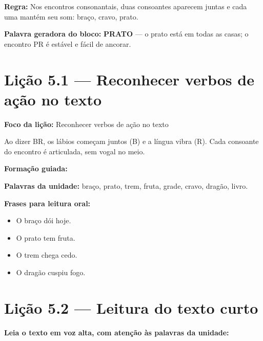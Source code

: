 \textbf{Regra:} Nos encontros consonantais, duas consoantes aparecem juntas e cada uma mantém seu som: braço, cravo, prato.

\textbf{Palavra geradora do bloco:} \textbf{PRATO} --- o prato está em todas as casas; o encontro PR é estável e fácil de ancorar.

\section{Lição 5.1 --- Reconhecer verbos de ação no texto}

\textbf{Foco da lição:} Reconhecer verbos de ação no texto


\begin{boquinha}
Ao dizer BR, os lábios começam juntos (B) e a língua vibra (R). Cada consoante do encontro é articulada, sem vogal no meio.
\end{boquinha}

\noindent\textbf{Formação guiada:}

\begin{center}
\end{center}

\noindent\textbf{Palavras da unidade:} braço, prato, trem, fruta, grade, cravo, dragão, livro.

\noindent\textbf{Frases para leitura oral:}
\begin{itemize}[leftmargin=1.6em]
  \item O braço dói hoje.
  \item O prato tem fruta.
  \item O trem chega cedo.
  \item O dragão cuspiu fogo.
\end{itemize}

\section{Lição 5.2 --- Leitura do texto curto}

\noindent\textbf{Leia o texto em voz alta, com atenção às palavras da unidade:}


